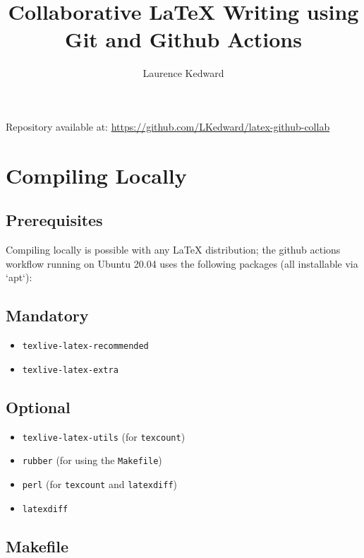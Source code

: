 \documentclass[]{article}
\title{Collaborative LaTeX Writing using Git and Github Actions}
\author{Laurence Kedward}
\begin{document}
\maketitle


Repository available at: \url{https://github.com/LKedward/latex-github-collab}

\section{Compiling Locally}

\subsection{Prerequisites}

Compiling locally is possible with any LaTeX distribution; the github actions workflow running on Ubuntu 20.04 uses the following packages (all installable via `apt`):

\subsection*{Mandatory}
\begin{itemize}
	
	\item \texttt{texlive-latex-recommended}
	\item \texttt{texlive-latex-extra}
	
\end{itemize}

\subsection*{Optional}
\begin{itemize}
	
	\item \texttt{texlive-latex-utils} \quad (for \texttt{texcount})
	\item \texttt{rubber} \quad (for using the \texttt{Makefile})
	\item \texttt{perl} \quad (for \texttt{texcount} and \texttt{latexdiff})
	\item \texttt{latexdiff}
	
\end{itemize}


\subsection{Makefile}
\end{document}
